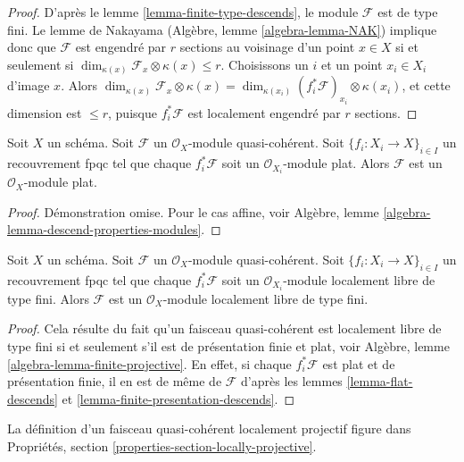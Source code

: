 \begin{proof}
D'après le lemme \ref{lemma-finite-type-descends}, le module $\mathcal{F}$
est de type fini. Le lemme de Nakayama
(Algèbre, lemme \ref{algebra-lemma-NAK}) implique donc que $\mathcal{F}$
est engendré par $r$ sections au voisinage d'un point $x \in X$
si et seulement si $\dim_{\kappa(x)} \mathcal{F}_x \otimes \kappa(x) \leq r$.
Choisissons un $i$ et un point $x_i \in X_i$ d'image $x$. Alors
$\dim_{\kappa(x)} \mathcal{F}_x \otimes \kappa(x) = 
\dim_{\kappa(x_i)} (f_i^*\mathcal{F})_{x_i} \otimes \kappa(x_i)$,
et cette dimension est $\leq r$, puisque $f_i^*\mathcal{F}$ est localement engendré par $r$
sections.
\end{proof}

\begin{lemma}
\label{lemma-flat-descends}
Soit $X$ un schéma.
Soit $\mathcal{F}$ un $\mathcal{O}_X$-module quasi-cohérent.
Soit $\{f_i : X_i \to X\}_{i \in I}$ un recouvrement fpqc tel que
chaque $f_i^*\mathcal{F}$ soit un $\mathcal{O}_{X_i}$-module plat.
Alors $\mathcal{F}$ est un $\mathcal{O}_X$-module plat.
\end{lemma}

\begin{proof}
Démonstration omise. Pour le cas affine, voir
Algèbre, lemme \ref{algebra-lemma-descend-properties-modules}.
\end{proof}

\begin{lemma}
\label{lemma-finite-locally-free-descends}
Soit $X$ un schéma.
Soit $\mathcal{F}$ un $\mathcal{O}_X$-module quasi-cohérent.
Soit $\{f_i : X_i \to X\}_{i \in I}$ un recouvrement fpqc tel que
chaque $f_i^*\mathcal{F}$ soit un $\mathcal{O}_{X_i}$-module localement libre de type fini.
Alors $\mathcal{F}$ est un $\mathcal{O}_X$-module localement libre de type fini.
\end{lemma}

\begin{proof}
Cela résulte du fait qu'un faisceau quasi-cohérent est localement libre de type fini
si et seulement s'il est de présentation finie et plat, voir
Algèbre, lemme \ref{algebra-lemma-finite-projective}.
En effet, si chaque $f_i^*\mathcal{F}$ est plat et de présentation finie,
il en est de même de $\mathcal{F}$ d'après les
lemmes \ref{lemma-flat-descends} et
\ref{lemma-finite-presentation-descends}.
\end{proof}

\noindent
La définition d'un faisceau quasi-cohérent localement projectif figure dans
Propriétés, section \ref{properties-section-locally-projective}.

